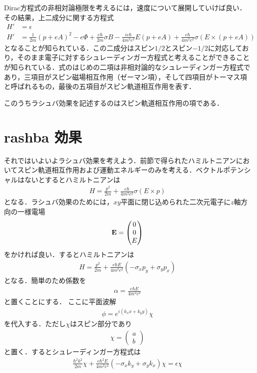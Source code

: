 \documentclass[a4j]{jarticle}
\begin{document}
Dirac方程式の非相対論極限を考えるには，速度について展開していけば良い．その結果，上二成分に関する方程式
\begin{align*}
 H'&=\epsilon \\
 H'&=\frac{1}{2m}\left(p+eA\right)^2-e\Phi+\frac{e\hbar}{2m}\sigma B-\frac{ie\hbar}{4m^2c^2}E(p+eA)+\frac{e\hbar}{4m^2c^2}\sigma \left(E\times(p+eA)\right)
\end{align*}
となることが知られている．この二成分はスピン$1/2$とスピン$-1/2$に対応しており，そのまま電子に対するシュレーディンガー方程式と考えることができることが知られている．式のはじめの二項は非相対論的なシュレーディンガー方程式であり，三項目がスピン磁場相互作用（ゼーマン項），そして四項目がトーマス項と呼ばれるもの，最後の五項目がスピン軌道相互作用を表す．

このうちラシュバ効果を記述するのはスピン軌道相互作用の項である．

\section{rashba 効果}
それではいよいよラシュバ効果を考えよう．前節で得られたハミルトニアンにおいてスピン軌道相互作用および運動エネルギーのみを考える．ベクトルポテンシャルはないとするとハミルトニアンは
\begin{align*}
 H=\frac{p^2}{2m}+\frac{e\hbar}{4m^2c^2}\sigma \left(E\times p\right)
\end{align*}
となる．ラシュバ効果のためには，$xy$平面に閉じ込められた二次元電子に$z$軸方向の一様電場
  \begin{align*}
   {\bf E}=\begin{pmatrix}
	    0 \\
	    0 \\
	    E 
	   \end{pmatrix}
  \end{align*}
をかければ良い．するとハミルトニアンは
\begin{align*}
 H=\frac{p^2}{2m}+\frac{e\hbar E}{4m^2c^2}\left(-\sigma_xp_y+\sigma_yp_x\right)
\end{align*}
となる．簡単のため係数を
\begin{align*}
 \alpha =\frac{e\hbar E}{4m^2c^2}
\end{align*}
と置くことにする．
ここに平面波解
\begin{align*}
 \phi =e^{i\left(k_xx+k_yy\right)}\chi
\end{align*}
を代入する．ただし$\chi$はスピン部分であり
\begin{align*}
 \chi=
\begin{pmatrix}
 a \\
 b 
\end{pmatrix}
\end{align*}
と置く．するとシュレーディンガー方程式は
\begin{align*}
 \frac{\hbar^2k^2}{2m}\chi +\frac{e\hbar^2 E}{4m^2c^2}\left(-\sigma_xk_y+\sigma_yk_x\right)\chi=\epsilon \chi \\
 \end{align*}
\end{document}
